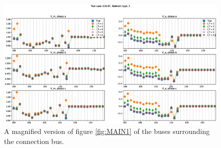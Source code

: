 \begin{figure}[h]
\centering
\includegraphics[width=\textwidth]{Images/Z_MAI_N1.eps}
\caption{A magnified version of figure \ref{fig:MAIN1} of the buses surrounding the connection bus.}\label{fig:ZMAIN1}
\end{figure}